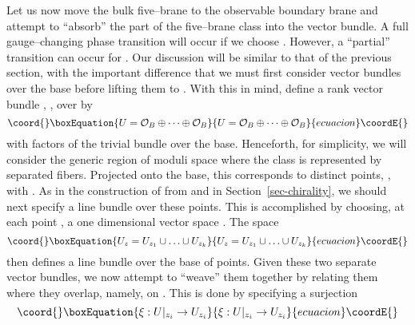 \documentclass[a4paper,12pt]{article}
\numberwithin{equation}{section}
\def\cO{{\mathcal O}}
\theoremstyle{plain}
\begin{document}
Let us now move the bulk five--brane to the observable boundary brane and
attempt to ``absorb'' the \coordHE{} part of the five--brane class into the
vector bundle. A full gauge--changing phase transition will occur if we choose
\coordHE{}. However, a ``partial'' transition can occur for \coordHE{}. 
Our discussion will be similar to that of the previous section,
with the important difference that we must first consider vector bundles over
the base \coordHE{} before lifting them to \coordHE{}. With this in mind, define a
rank \coordHE{} vector bundle , \coordHE{}, over \coordHE{} by
\begin{equation}\coord{}\boxEquation{
U= \cO_{B} \oplus \dots \oplus \cO_{B}
\label{eq:145}
}{
U= \cO_{B} \oplus \dots \oplus \cO_{B}
}{ecuacion}\coordE{}\end{equation}
with \coordHE{} factors of the trivial bundle \myHighlight{$\cO_{B}$}\coordHE{} over the base. Henceforth,
for simplicity, we will consider the generic region of moduli space where the
class \coordHE{} is represented by \coordHE{} separated fibers. Projected onto the
base, this corresponds to \coordHE{} distinct points, \coordHE{}, with
\coordHE{}. As in the construction of \coordHE{} from \coordHE{}
and \coordHE{} in Section~\ref{sec-chirality}, 
we should next specify a line bundle over these points. This
is accomplished by choosing, at each point \coordHE{}, a one dimensional vector
space \coordHE{}.
The space
\begin{equation}\coord{}\boxEquation{
U_{z}=U_{z_{1}}\cup \ldots \cup U_{z_{k}}
\label{eq:147}
}{
U_{z}=U_{z_{1}}\cup \ldots \cup U_{z_{k}}
}{ecuacion}\coordE{}\end{equation}
then defines a line bundle over the base
\coordHE{} of points. 
Given these two separate vector
bundles, we now attempt to ``weave'' them together by relating them where they
overlap, namely, on \coordHE{}. This is
done  by specifying a surjection
\begin{equation}\coord{}\boxEquation{
\xi:U|_{z_{i}} \rightarrow U_{z_{i}}
\label{eq:148}
}{
\xi:U|_{z_{i}} \rightarrow U_{z_{i}}
}{ecuacion}\coordE{}\end{equation}
\end{document}
